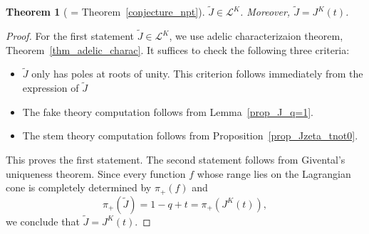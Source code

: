 \documentclass[11pt]{amsart}
\newtheorem{theorem}{Theorem}[section]
\newtheorem*{main theorem*}{Main Theorem}
\theoremstyle{remark}
\numberwithin{equation}{section}
\begin{document}
\begin{theorem}[ = Theorem~\ref{conjecture_npt}] \label{thm_conj}
    $\tilde{J} \in \mathcal{L}^{K}$. Moreover, $\tilde{J} = J^K(t)$. 
\end{theorem}
\begin{proof}
For the first statement $\tilde{J} \in \mathcal{L}^{K}$, we use adelic characterizaion theorem, Theorem~\ref{thm_adelic_charac}. It suffices to check the following three criteria:
\begin{itemize}
    \item[(i)] $\tilde{J}$ only has poles at roots of unity. This criterion follows immediately from the expression of $\tilde{J}$
    \item[(ii)] The fake theory computation follows from Lemma~\ref{prop_J_q=1}.
    \item[(iii)] The stem theory computation follows from Proposition~\ref{prop_Jzeta_tnot0}.
\end{itemize}
This proves the first statement. The second statement follows from Givental's uniqueness theorem. Since every function $f$ whose range lies on the Lagrangian cone is completely determined by $\pi_+(f)$ and
\[
\pi_+(\tilde{J}) = 1- q + t = \pi_+ ( J^K(t) ) ,
\]
we conclude that $\tilde{J} = J^K(t)$. 
\end{proof}    
\end{document}
